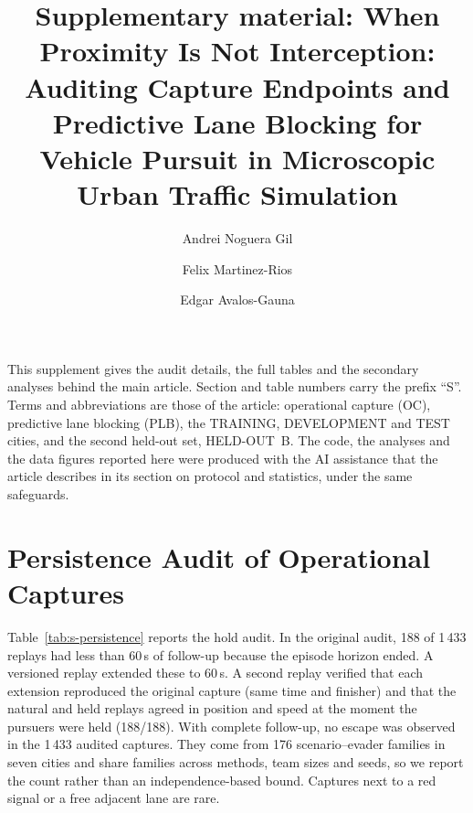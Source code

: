 \documentclass[preprint,12pt]{elsarticle}
\begin{document}
\begin{frontmatter}

\title{Supplementary material: When Proximity Is Not Interception: Auditing Capture Endpoints and Predictive Lane Blocking for Vehicle Pursuit in Microscopic Urban Traffic Simulation}

\author[1]{Andrei Noguera Gil}
\author[1]{Felix Martinez-Rios}
\author[2]{Edgar Avalos-Gauna}



\end{frontmatter}



\noindent This supplement gives the audit details, the full tables and the secondary analyses behind the main article.
Section and table numbers carry the prefix ``S''. Terms and abbreviations are those of the article: operational
capture (OC), predictive lane blocking (PLB), the TRAINING, DEVELOPMENT and TEST cities, and the second held-out
set, HELD-OUT~B. The code, the analyses and the data figures reported here were produced with the AI assistance that
the article describes in its section on protocol and statistics, under the same safeguards.

\section{Persistence Audit of Operational Captures}\label{sec:s-hold}

Table~\ref{tab:s-persistence} reports the hold audit. In the original audit, 188 of 1\,433 replays had less than
60\,s of follow-up because the episode horizon ended. A versioned replay extended these to 60\,s. A second replay
verified that each extension reproduced the original capture (same time and finisher) and that the natural and held
replays agreed in position and speed at the moment the pursuers were held (188/188). With complete follow-up, no escape
was observed in the 1\,433 audited captures. They come from 176 scenario--evader families in seven cities and share
families across methods, team sizes and seeds, so we report the count rather than an independence-based bound.
Captures next to a red signal or a free adjacent lane are rare.
\end{document}
